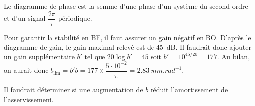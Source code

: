 \begin{multicols}{2}
\begin{corrige}
Le diagramme de  phase est la somme d'une phase d'un système du second ordre et d'un signal $\dfrac{2\pi}{\tau}$ périodique. 

\end{corrige}
\else
\fi
{}
\ifprof
\begin{corrige}
Pour garantir la stabilité en BF, il faut assurer un gain négatif en BO. D'après le diagramme de gain, le gain maximal relevé est de \SI{45}{dB}. Il faudrait donc ajouter un gain supplémentaire $b'$ tel que $20\log b' = 45$ soit $b'=10^{45/20}=177$. Au bilan, on aurait donc $b_{\text{lim}}=b' b = 177\times \dfrac{5\cdot 10^{-2}}{\pi}=
\SI{2,83}{mm.rad^{-1}}$.

Il faudrait déterminer si une augmentation de $b$ réduit l'amortissement de l'asservissement. 
\end{corrige}
\else
\fi

\ifprof
\else
\end{multicols}
\fi

